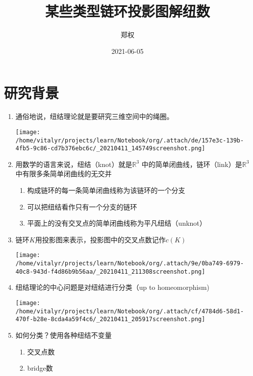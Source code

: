 \documentclass[bigger]{beamer}
\author{郑权}
\date{2021-06-05}
\title{某些类型链环投影图解纽数}
\begin{document}
\maketitle
\tableofcontents

\section{研究背景}
\label{sec:org3491ef9}
\begin{enumerate}
\item 通俗地说，纽结理论就是要研究三维空间中的绳圈。
\label{sec:org3f69b41}
\begin{center}
\texttt{[image: /home/vitalyr/projects/learn/Notebook/org/.attach/de/157e3c-139b-4fb5-9c86-cd7b376ebc6c/\_20210411\_145749screenshot.png]}
\end{center}
\item 用数学的语言来说，纽结（knot）就是\(\mathbb{R}^{3}\) 中的简单闭曲线，链环（link）是\(\mathbb{R}^{3}\)中有限多条简单闭曲线的无交并
\label{sec:orga4d1cb6}
\begin{enumerate}
\item 构成链环的每一条简单闭曲线称为该链环的一个分支
\label{sec:org49567ee}
\item 可以把纽结看作只有一个分支的链环
\label{sec:org39474af}
\item 平面上的没有交叉点的简单闭曲线称为平凡纽结（unknot）
\label{sec:org5a513f4}
\end{enumerate}
\item 链环\(K\)用投影图来表示，投影图中的交叉点数记作\(c(K)\)
\label{sec:orga019cc1}
\begin{center}
\texttt{[image: /home/vitalyr/projects/learn/Notebook/org/.attach/9e/0ba749-6979-40c8-943d-f4d86b9b56aa/\_20210411\_211308screenshot.png]}
\end{center}
\item 纽结理论的中心问题是对纽结进行分类（up to homeomorphism)
\label{sec:org1e8753a}
\begin{center}
\texttt{[image: /home/vitalyr/projects/learn/Notebook/org/.attach/cf/4784d6-58d1-470f-b28e-8cda4a59f4c6/\_20210411\_205917screenshot.png]}
\end{center}
\item 如何分类？使用各种纽结不变量
\label{sec:orgceee81b}
\begin{enumerate}
\item 交叉点数
\label{sec:org0e2d5d2}
\item bridge数
\label{sec:org7da4328}

\end{enumerate}
\end{enumerate}
\end{document}

